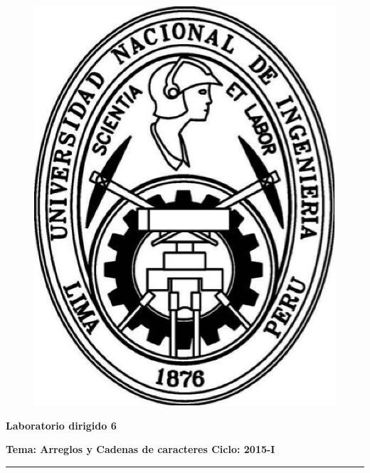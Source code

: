 \documentclass[11pt,a4paper]{article}
\begin{document}
\begin{center}
\begin{figure}[ht!]
\begin{minipage}[c]{0.2\linewidth}
\includegraphics[scale=0.25]{EscudoUNI.eps}
\end{minipage}
\hfill{}
\begin{minipage}{0,8\columnwidth}
\centering{}
\end{minipage}
\end{figure}
\end{center}
\vspace*{-0.50cm}
\noindent

\begin{center}
\textbf{\Large Laboratorio dirigido 6}
\end{center}
\textbf{Tema: Arreglos y Cadenas de caracteres \hfill Ciclo: 2015-I}
\noindent
\rule{\textwidth}{2pt}
\newline
\end{document}
